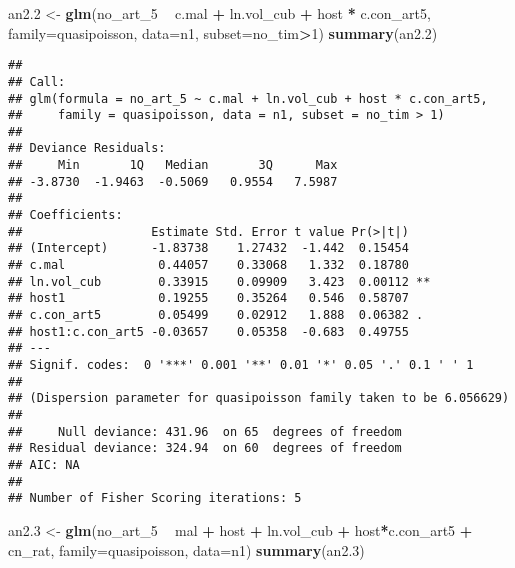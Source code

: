 \documentclass[]{article}
\newenvironment{Shaded}{\begin{snugshade}}{\end{snugshade}}
\newcommand{\KeywordTok}[1]{\textcolor[rgb]{0.13,0.29,0.53}{\textbf{#1}}}
\newcommand{\DataTypeTok}[1]{\textcolor[rgb]{0.13,0.29,0.53}{#1}}
\newcommand{\DecValTok}[1]{\textcolor[rgb]{0.00,0.00,0.81}{#1}}
\newcommand{\StringTok}[1]{\textcolor[rgb]{0.31,0.60,0.02}{#1}}
\newcommand{\OperatorTok}[1]{\textcolor[rgb]{0.81,0.36,0.00}{\textbf{#1}}}
\newcommand{\NormalTok}[1]{#1}
\begin{document}
\begin{Shaded}
\begin{Highlighting}[]
\NormalTok{an2.}\DecValTok{2}\NormalTok{ <-}\StringTok{ }\KeywordTok{glm}\NormalTok{(no_art_}\DecValTok{5} \OperatorTok{~}\StringTok{ }\NormalTok{c.mal }\OperatorTok{+}\StringTok{ }\NormalTok{ln.vol_cub }\OperatorTok{+}\StringTok{ }\NormalTok{host }\OperatorTok{*}\StringTok{ }\NormalTok{c.con_art5, }
             \DataTypeTok{family=}\NormalTok{quasipoisson, }\DataTypeTok{data=}\NormalTok{n1, }\DataTypeTok{subset=}\NormalTok{no_tim}\OperatorTok{>}\DecValTok{1}\NormalTok{)}
\KeywordTok{summary}\NormalTok{(an2.}\DecValTok{2}\NormalTok{)}
\end{Highlighting}
\end{Shaded}

\begin{verbatim}
## 
## Call:
## glm(formula = no_art_5 ~ c.mal + ln.vol_cub + host * c.con_art5, 
##     family = quasipoisson, data = n1, subset = no_tim > 1)
## 
## Deviance Residuals: 
##     Min       1Q   Median       3Q      Max  
## -3.8730  -1.9463  -0.5069   0.9554   7.5987  
## 
## Coefficients:
##                  Estimate Std. Error t value Pr(>|t|)   
## (Intercept)      -1.83738    1.27432  -1.442  0.15454   
## c.mal             0.44057    0.33068   1.332  0.18780   
## ln.vol_cub        0.33915    0.09909   3.423  0.00112 **
## host1             0.19255    0.35264   0.546  0.58707   
## c.con_art5        0.05499    0.02912   1.888  0.06382 . 
## host1:c.con_art5 -0.03657    0.05358  -0.683  0.49755   
## ---
## Signif. codes:  0 '***' 0.001 '**' 0.01 '*' 0.05 '.' 0.1 ' ' 1
## 
## (Dispersion parameter for quasipoisson family taken to be 6.056629)
## 
##     Null deviance: 431.96  on 65  degrees of freedom
## Residual deviance: 324.94  on 60  degrees of freedom
## AIC: NA
## 
## Number of Fisher Scoring iterations: 5
\end{verbatim}

\begin{Shaded}
\begin{Highlighting}[]
\NormalTok{an2.}\DecValTok{3}\NormalTok{ <-}\StringTok{ }\KeywordTok{glm}\NormalTok{(no_art_}\DecValTok{5} \OperatorTok{~}\StringTok{ }\NormalTok{mal }\OperatorTok{+}\StringTok{ }\NormalTok{host }\OperatorTok{+}\StringTok{ }\NormalTok{ln.vol_cub }\OperatorTok{+}\StringTok{ }\NormalTok{host}\OperatorTok{*}\NormalTok{c.con_art5 }\OperatorTok{+}\StringTok{ }\NormalTok{cn_rat, }
             \DataTypeTok{family=}\NormalTok{quasipoisson, }\DataTypeTok{data=}\NormalTok{n1)}
\KeywordTok{summary}\NormalTok{(an2.}\DecValTok{3}\NormalTok{)}
\end{Highlighting}
\end{Shaded}
\end{document}
